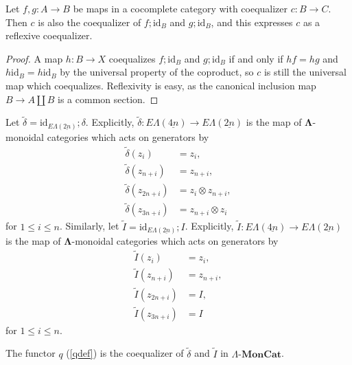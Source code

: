 \documentclass{amsbook} %
\newcommand{\mb}{\mathbf}
\newcommand{\id}{\textrm{id}}
\newcommand{\ML}{\mathbf{\Lambda}}
\newcommand{\ELnn}{E\Lambda(\underline{2n})}
\newcommand{\ELnnnn}{E\Lambda(\underline{4n})}
\newcommand{\lmc}{\Lambda\mbox{-}\mb{MonCat}}
\numberwithin{section}{chapter}
\begin{document}
\begin{lem}\label{sum_coeq}
Let $f, g \colon  A \rightarrow B$ be maps in a cocomplete category with coequalizer $c \colon  B \rightarrow C$. Then $c$ is also the coequalizer of $f;\id_B$ and $g; \id_B$, and this expresses $c$ as a reflexive coequalizer.
\end{lem}
\begin{proof}
A map $h \colon  B \rightarrow X$ coequalizes $f;\id_B$ and $g; \id_B$ if and only if $hf = hg$ and $h \id_B = h \id_B$ by the universal property of the coproduct, so $c$ is still the universal map which coequalizes. Reflexivity is easy, as the canonical inclusion map $B \rightarrow A \coprod B$ is a common section.

\end{proof}

\begin{Defi} \label{coprodmapdef} Let $\tilde{\delta} = \id_{\ELnn};\delta$.
Explicitly, $\tilde{\delta} \colon \ELnnnn \rightarrow \ELnn$ is the map of $\ML$-monoidal categories which acts on generators by
  \begin{align*}
		\tilde{\delta}(z_i) &= z_i, \\
		\tilde{\delta}(z_{n+i}) &= z_{n+i}, \\
		\tilde{\delta}(z_{2n+i}) &= z_i \otimes z_{n+i}, \\
		\tilde{\delta}(z_{3n+i}) &= z_{n+i} \otimes z_i
	\end{align*}
for $1 \le i \le n$. Similarly, let $\tilde{I} = \id_{\ELnn};I$.
Explicitly, $\tilde{I} \colon \ELnnnn \rightarrow \ELnn$ is the map of $\ML$-monoidal categories which acts on generators by
  \begin{align*}
		\tilde{I}(z_i) &= z_i,  \\
		\tilde{I}(z_{n+i}) &= z_{n+i}, \\
		\tilde{I}(z_{2n+i}) &= I, \\
		\tilde{I}(z_{3n+i}) &= I
	\end{align*} 
for $1 \le i \le n$. 
\end{Defi}



\begin{cor}\label{q_other_coeq} The functor $q$ (\cref{qdef}) is the coequalizer of $\tilde{\delta}$ and $\tilde{I}$ in $\lmc$.
\end{cor}
\end{document}
